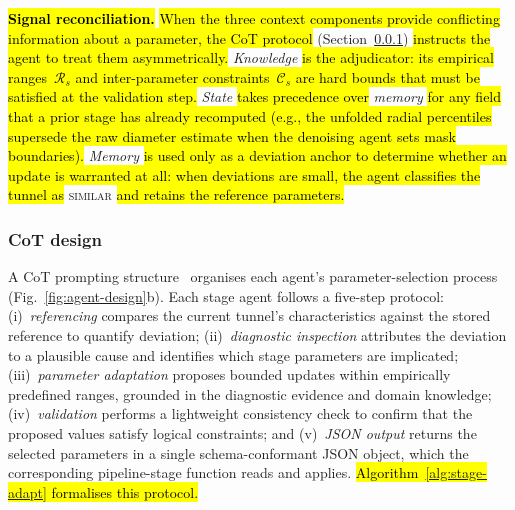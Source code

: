 \documentclass[a4paper,fleqn]{cas-dc}
\begin{document}
{\hl{\textbf{Signal reconciliation.}} \hl{When the three context components provide conflicting information about a parameter, the CoT protocol} (Section~\ref{sec:cot}) \hl{instructs the agent to treat them asymmetrically.} \emph{Knowledge} \hl{is the adjudicator: its empirical ranges~$\mathcal{R}_s$ and inter-parameter constraints~$\mathcal{C}_s$ are hard bounds that must be satisfied at the validation step.} \emph{State} \hl{takes precedence over} \emph{memory} \hl{for any field that a prior stage has already recomputed (e.g., the unfolded radial percentiles supersede the raw diameter estimate when the denoising agent sets mask boundaries).} \emph{Memory} \hl{is used only as a deviation anchor to determine whether an update is warranted at all: when deviations are small, the agent classifies the tunnel as} \mbox{\textsc{similar}} \hl{and retains the reference parameters.}

\subsubsection{CoT design}\label{sec:cot}

A CoT prompting structure~\cite{yao2023react} organises each agent's parameter-selection process (Fig.~\ref{fig:agent-design}b). Each stage agent follows a five-step protocol: (i)~\emph{referencing} compares the current tunnel's characteristics against the stored reference to quantify deviation; (ii)~\emph{diagnostic inspection} attributes the deviation to a plausible cause and identifies which stage parameters are implicated; (iii)~\emph{parameter adaptation} proposes bounded updates within empirically predefined ranges, grounded in the diagnostic evidence and domain knowledge; (iv)~\emph{validation} performs a lightweight consistency check to confirm that the proposed values satisfy logical constraints; and (v)~\emph{JSON output} returns the selected parameters in a single schema-conformant JSON object, which the corresponding pipeline-stage function reads and applies. \hl{Algorithm~\mbox{\ref{alg:stage-adapt}} formalises this protocol.}

}
\end{document}
